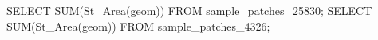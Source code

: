 \lstset{caption=Crear una función para calcular el IDW (I),label= IDW1}
\begin{SQL}
SELECT SUM(St_Area(geom)) FROM sample_patches_25830;
SELECT SUM(St_Area(geom)) FROM sample_patches_4326;
\end{SQL}
